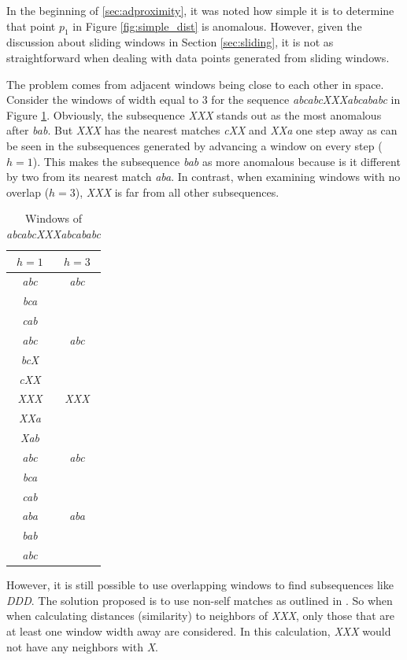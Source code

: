 In the beginning of \ref{sec:adproximity}, it was noted how simple it is to determine that point $p_1$ in Figure \ref{fig:simple_dist} is anomalous. However, given the discussion about sliding windows in Section \ref{sec:sliding}, it is not as straightforward when dealing with data points generated from sliding windows.

The problem comes from adjacent windows being close to each other in space. Consider the windows of width equal to 3 for the sequence \emph{abcabcXXXabcababc} \cite{Keogh2005} in Figure \ref{tbl:selfmatch}. Obviously, the subsequence \emph{XXX} stands out as the most anomalous after \emph{bab}. But \emph{XXX} has the nearest matches \emph{cXX} and \emph{XXa} one step away as can be seen in the subsequences generated by advancing a window on every step ($h=1$). This makes the subsequence \emph{bab} as more anomalous because is it different by two from its nearest match \emph{aba}. In contrast, when examining windows with no overlap ($h=3$), \emph{XXX} is far from all other subsequences.

\begin{table}[h]
  \centering
  \begin{tabular}{|c|c|}
    \hline
    $h=1$ & $h=3$ \\
    \hline
    \hline
    \emph{abc} & \emph{abc} \\
    \emph{bca} & \\
    \emph{cab} & \\
    \hline
    \emph{abc} & \emph{abc} \\
    \emph{bcX} & \\
    \emph{cXX} & \\
    \hline
    \emph{XXX} & \emph{XXX} \\
    \emph{XXa} & \\
    \emph{Xab} & \\
    \hline
    \emph{abc} & \emph{abc} \\
    \emph{bca} & \\
    \emph{cab} & \\
    \hline
    \emph{aba} & \emph{aba} \\ 
    \emph{bab} & \\
    \emph{abc} & \\
    \hline
  \end{tabular}
  \caption{Windows of \emph{abcabcXXXabcababc}}
  \label{tbl:selfmatch}
\end{table}

However, it is still possible to use overlapping windows to find subsequences like \emph{DDD}. The solution proposed is to use non-self matches as outlined in \cite{Keogh2005}. So when when calculating distances (similarity) to neighbors of \emph{XXX}, only those that are at least one window width away are considered. In this calculation, \emph{XXX} would not have any neighbors with \emph{X}.

